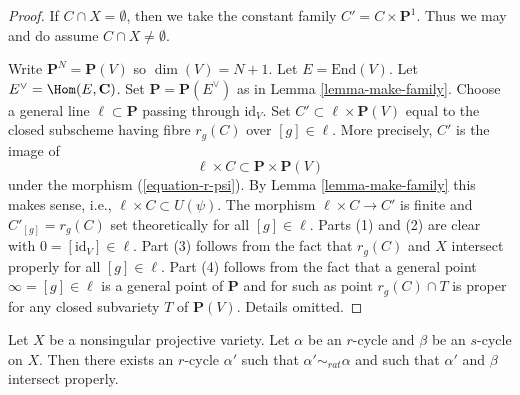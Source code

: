 \begin{proof}
If $C \cap X = \emptyset$, then we take the constant family
$C' = C \times \mathbf{P}^1$. Thus we may and do assume
$C \cap X \not = \emptyset$.

\medskip\noindent
Write $\mathbf{P}^N = \mathbf{P}(V)$ so $\dim(V) = N + 1$. Let
$E = \text{End}(V)$. Let $E^\vee = \Hom(E, \mathbf{C})$. Set
$\mathbf{P} = \mathbf{P}(E^\vee)$ as in Lemma \ref{lemma-make-family}.
Choose a general line $\ell \subset \mathbf{P}$ passing through $\text{id}_V$.
Set $C' \subset \ell \times \mathbf{P}(V)$ equal to the
closed subscheme having fibre $r_g(C)$ over $[g] \in \ell$.
More precisely, $C'$ is the image of
$$
\ell \times C \subset \mathbf{P} \times \mathbf{P}(V)
$$
under the morphism (\ref{equation-r-psi}). By Lemma \ref{lemma-make-family}
this makes sense, i.e., $\ell \times C \subset U(\psi)$. The morphism
$\ell \times C \to C'$ is finite and $C'_{[g]} = r_g(C)$ set theoretically
for all $[g] \in \ell$. Parts (1) and (2) are clear with
$0 = [\text{id}_V] \in \ell$. Part (3) follows from the fact
that $r_g(C)$ and $X$ intersect properly for all $[g] \in \ell$.
Part (4) follows from the fact that a general point $\infty = [g] \in \ell$
is a general point of $\mathbf{P}$ and for such as point
$r_g(C) \cap T$ is proper for any closed subvariety $T$ of $\mathbf{P}(V)$.
Details omitted.
\end{proof}

\begin{lemma}
\label{lemma-moving-move}
Let $X$ be a nonsingular projective variety. Let $\alpha$ be an
$r$-cycle and $\beta$ be an $s$-cycle on $X$. Then there exists
an $r$-cycle $\alpha'$ such that $\alpha' \sim_{rat} \alpha$ and
such that $\alpha'$ and $\beta$ intersect properly.
\end{lemma}

